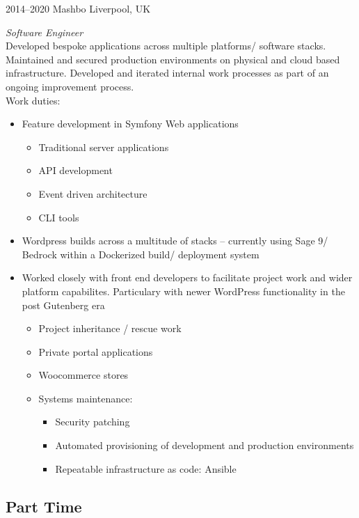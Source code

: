 \documentclass[]{friggeri-cv} %
\begin{document}
\begin{entrylist}


\entry
{2014--2020}
{Mashbo}
{Liverpool, UK}
{\emph{Software Engineer} \\
Developed bespoke applications across multiple platforms/ software stacks.  
Maintained and secured production environments on physical and cloud based infrastructure.
Developed and iterated internal work processes as part of an ongoing improvement process.\\
Work duties:
\begin{itemize}
\item Feature development in Symfony Web applications
\begin{itemize}
\item Traditional server applications
\item API development
\item Event driven architecture
\item CLI tools
\end{itemize}
\item Wordpress builds across a multitude of stacks -- currently using Sage 9/ Bedrock within a Dockerized build/ deployment system
\item Worked closely with front end developers to facilitate project work and wider platform capabilites.  Particulary with newer WordPress functionality in the post Gutenberg era
\begin{itemize}
\item Project inheritance / rescue work
\item Private portal applications
\item Woocommerce stores
\item Systems maintenance:
\begin{itemize}
\item Security patching
\item Automated provisioning of development and production environments
\item Repeatable infrastructure as code: Ansible
\end{itemize}
\end{itemize}
\end{itemize}}


\end{entrylist}

\subsection{Part Time}
\end{document}
